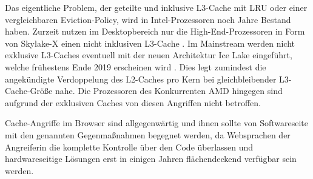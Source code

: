 Das eigentliche Problem, der geteilte und inklusive L3-Cache mit LRU oder einer vergleichbaren Eviction-Policy, wird in Intel-Prozessoren noch Jahre Bestand haben.
Zurzeit nutzen im Desktopbereich nur die High-End-Prozessoren in Form von Skylake-X einen nicht inklusiven L3-Cache \cite{SkylakeXL3Cache}.
Im Mainstream werden nicht exklusive L3-Caches eventuell mit der neuen Architektur Ice Lake eingeführt, welche frühestens Ende 2019 erscheinen wird \cite{IceLakeReleaseDate}.
Dies legt zumindest die angekündigte Verdoppelung des L2-Caches pro Kern bei gleichbleibender L3-Cache-Größe nahe.
Die Prozessoren des Konkurrenten AMD hingegen sind aufgrund der exklusiven Caches \cite{CacheRyzen} von diesen Angriffen nicht betroffen.

Cache-Angriffe im Browser sind allgegenwärtig und ihnen sollte von Softwareseite mit den genannten Gegenmaßnahmen begegnet werden, da Websprachen der Angreiferin die komplette Kontrolle über den Code überlassen und hardwareseitige Lösungen erst in einigen Jahren flächendeckend verfügbar sein werden.




